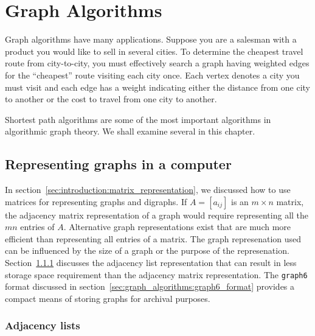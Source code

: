 
\chapter{Graph Algorithms}
\label{chap:graph_algorithms}

Graph algorithms have many applications. Suppose you are a salesman
with a product you would like to sell in several cities. To determine
the cheapest travel route from city-to-city, you must effectively
search a graph having weighted edges for the ``cheapest'' route
visiting each city once. Each vertex denotes a city you must visit and
each edge has a weight indicating either the distance from one city to
another or the cost to travel from one city to another.

Shortest path algorithms are some of the most important algorithms in
algorithmic graph theory. We shall examine several in this chapter.



\section{Representing graphs in a computer}

In section~\ref{sec:introduction:matrix_representation}, we discussed
how to use matrices for representing graphs and digraphs. If
$A = [a_{ij}]$ is an $m \times n$ matrix, the adjacency matrix
representation of a graph would require representing all the $mn$
entries of $A$. Alternative graph representations exist that are much
more efficient than representing all entries of a matrix. The graph
represenation used can be influenced by the size of a graph or the
purpose of the represenation.
Section~\ref{sec:graph_algorithms:adjacency_lists} discusses the
adjacency list representation that can result in less storage space
requirement than the adjacency matrix representation. The
\texttt{graph6} format discussed in
section~\ref{sec:graph_algorithms:graph6_format} provides a compact
means of storing graphs for archival purposes.



\subsection{Adjacency lists}
\label{sec:graph_algorithms:adjacency_lists}

